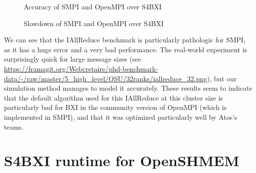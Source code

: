 \begin{figure}[!ht]
    \centering
    \caption{Accuracy of SMPI and OpenMPI over S4BXI}
    \label{fig:appendix:osu_32_time}
\end{figure}

\begin{figure}[!ht]
    \centering
    \caption{Slowdown of SMPI and OpenMPI over S4BXI}
    \label{fig:appendix:osu_32_perf}
\end{figure}

We can see that the IAllReduce benchmark is particularly pathologic for SMPI, as
it has a huge error and a very bad performance. The real-world experiment is
surprisingly quick for large message sizes (see
\url{https://framagit.org/Webcretaire/phd-benchmark-data/-/raw/master/5_high_level/OSU/32ranks/iallreduce_32.png}),
but our simulation method manages to model it accurately. These results seem to
indicate that the default algorithm used for this IAllReduce at this cluster
size is particularly bad for BXI in the community version of OpenMPI (which is
implemented in SMPI), and that it was optimized particularly well by Atos's
teams.

\chapter{S4BXI runtime for OpenSHMEM}
\label{app:oshmem_code}

\vspace{-1cm}

